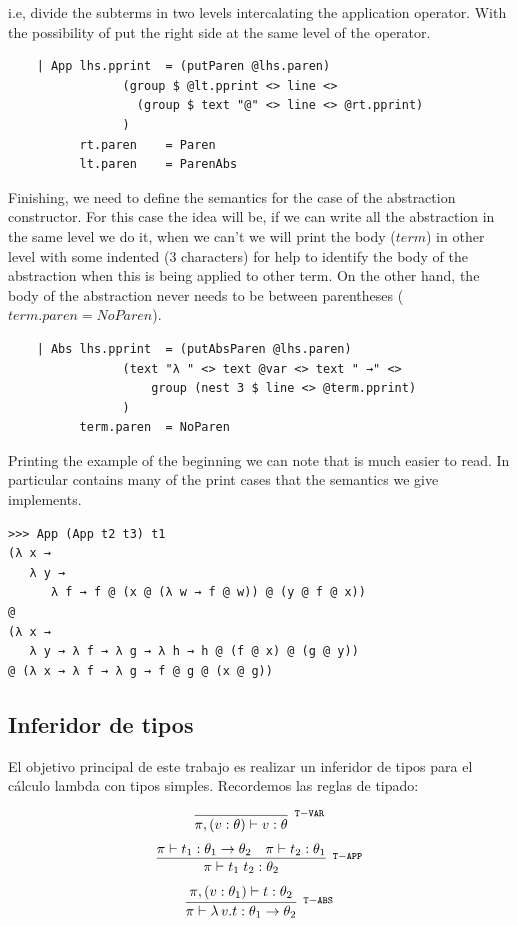 \documentclass[a4paper,10pt]{article}
\newcommand{\typejud}[3] {
  \ensuremath{#1 \vdash #2 : #3}
}
\begin{document}
i.e, divide the subterms in two levels intercalating the application operator. With the
possibility of put the right side at the same level of the operator.

\begin{lstlisting}    
    | App lhs.pprint  = (putParen @lhs.paren) 
                (group $ @lt.pprint <> line <> 
                  (group $ text "@" <> line <> @rt.pprint)
                )
          rt.paren    = Paren
          lt.paren    = ParenAbs
\end{lstlisting}    

Finishing, we need to define the semantics for the case of the abstraction constructor.
For this case the idea will be, if we can write all the abstraction in the same level
we do it, when we can't we will print the body ($term$) in other level with some
indented (3 characters) for help to identify the body of the abstraction when this
is being applied to other term. On the other hand, the body of the abstraction never
needs to be between parentheses ($term.paren = NoParen$).

\begin{lstlisting}
    | Abs lhs.pprint  = (putAbsParen @lhs.paren)
                (text "λ " <> text @var <> text " →" <> 
                    group (nest 3 $ line <> @term.pprint)
                )
          term.paren  = NoParen
\end{lstlisting}

Printing the example of the beginning we can note that is much easier to read. In
particular contains many of the print cases that the semantics we give implements.

\begin{verbatim}
>>> App (App t2 t3) t1
(λ x →
   λ y →
      λ f → f @ (x @ (λ w → f @ w)) @ (y @ f @ x))
@
(λ x →
   λ y → λ f → λ g → λ h → h @ (f @ x) @ (g @ y))
@ (λ x → λ f → λ g → f @ g @ (x @ g))
\end{verbatim}

\subsection{Inferidor de tipos}
 El objetivo principal de este trabajo es realizar un inferidor de tipos para el cálculo lambda con tipos simples. Recordemos
 las reglas de tipado:
 
 \begin{align*}
 \infer[^{\mathtt{T-VAR}}]
       {\typejud{\pi,(v:\theta)}{v}{\theta}}
       {}
 \end{align*}
  \begin{align*}
  \infer[^{\mathtt{T-APP}}]
       {\typejud{\pi}{t_1\;t_2}{\theta_2}}
       {\typejud{\pi}{t_1}{\theta_1\rightarrow\theta_2} &
        \typejud{\pi}{t_2}{\theta_1}
       }
  \end{align*}
  \begin{align*}
  \infer[^{\mathtt{T-ABS}}]
       {\typejud{\pi}{\lambda\,v.t}{\theta_1 \rightarrow \theta_2}}
       {\typejud{\pi,(v:\theta_1)}{t}{\theta_2}
       }
  \end{align*}
 
\end{document}
